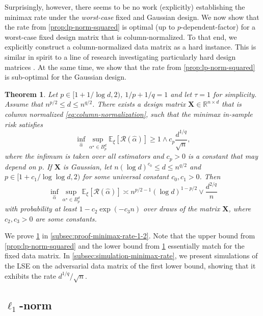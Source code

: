 \documentclass[a4paper]{article}
\newcommand{\br}[1]{\left[#1\right]}
\newcommand{\X}[0]{\mathbf{X}}
\newcommand{\EE}[0]{\mathbb{E}}
\newcommand{\RR}[0]{\mathbb{R}}
\newcommand{\cR}[0]{\mathcal{R}}
\newcommand{\ha}[0]{\widehat{\alpha}}
\newcommand{\alphastar}{\alpha^\star}
\theoremstyle{thmstyle}
\newtheorem{theorem}{Theorem}
\theoremstyle{defstyle}
\theoremstyle{remark}
\begin{document}
Surprisingly, however, there seems to be no work (explicitly) establishing the minimax rate under the \emph{worst-case} fixed and Gaussian design. We now show that the rate from \cref{prop:lp-norm-squared} is optimal (up to $p$-dependent-factor) for a worst-case fixed design matrix that is column-normalized.
To that end, we explicitly construct a column-normalized data matrix as a hard instance. This is similar in spirit to a line of research investigating particularly hard design matrices  
\citep{Rigollet2010exponentialscreeningoptimalrates,Zhang2017,Pathak2024design,Foygel2011fastrate,Dalalyan2017}.
At the same time, we show that the rate from \cref{prop:lp-norm-squared} is sub-optimal for the Gaussian design.
\begin{theorem}
\label{thm:minimax-rate-1-2}
    Let $p\in[1+1/\log d,2)$, $1/p+1/q=1$ and let $\tau=1$ for simplicity. Assume that $n^{p/2} \leq d \leq n^{q/2}$.
    There exists a design matrix $\X\in\RR^{n\times d}$ that is column normalized \eqref{eq:column-normalization}, such that the minimax in-sample risk satisfies
    \begin{equation*}
         \inf_{\ha}\sup_{\alphastar\in B_p^d}\EE_\xi \br{\cR(\ha)} \geq 1\wedge c_p \frac{d^{1/q}}{\sqrt{n}},
    \end{equation*}
    where the infimum is taken over all estimators and $c_p>0$ is a constant that may depend on $p$.
    If $\X$ is Gaussian, let $ n(\log d)^{c_0} \leq d \leq n^{q/2}$ and $p\in[ 1+c_1/\log \log d,2)$ for some universal constant $c_0,c_1>0$. Then
    \begin{equation*}
        \inf_{\ha} \sup_{\alphastar\in B_p^d}\EE_\xi \br{\cR(\ha)} \asymp n^{p/2-1}(\log d)^{1-p/2}\vee \frac{d^{2/q}}{n}
    \end{equation*}
    with probability at least $1-c_2\exp(-c_3n)$ over draws of the matrix $\X$, where $c_2,c_3>0$ are some constants.
\end{theorem}

\noindent We prove \cref{thm:minimax-rate-1-2} in \cref{subsec:proof-minimax-rate-1-2}. Note that the upper bound from \cref{prop:lp-norm-squared} and the lower bound from \cref{thm:minimax-rate-1-2} essentially match for the fixed data matrix. 
In \cref{subsec:simulation-minimax-rate}, we present simulations of the LSE on the adversarial data matrix of the first lower bound, showing that it exhibits the rate $d^{1/q}/\sqrt{n}$.

\subsection{\texorpdfstring{$\ell_1$}{l1}-norm}
\label{subsec:l1-constraints}
\end{document}
